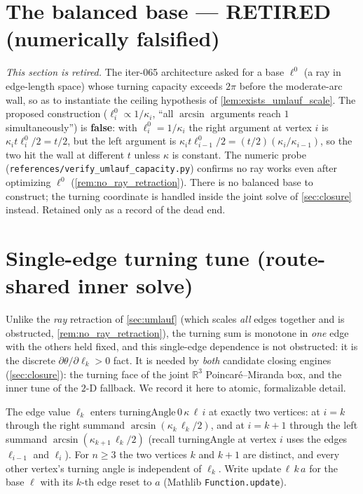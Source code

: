 \section{The balanced base --- RETIRED (numerically falsified)}
\label{sec:balanced}

\emph{This section is retired.} The iter-065 architecture asked for a base
$\ell^0$ (a ray in edge-length space) whose turning capacity exceeds $2\pi$
before the moderate-arc wall, so as to instantiate the ceiling hypothesis of
\cref{lem:exists_umlauf_scale}. The proposed construction ($\ell^0_i \propto
1/\kappa_i$, ``all $\arcsin$ arguments reach $1$ simultaneously'') is
\textbf{false}: with $\ell^0_i = 1/\kappa_i$ the right argument at vertex $i$ is
$\kappa_i t \ell^0_i/2 = t/2$, but the left argument is $\kappa_i t \ell^0_{i-1}/2
= (t/2)(\kappa_i/\kappa_{i-1})$, so the two hit the wall at different $t$ unless
$\kappa$ is constant. The numeric probe
(\texttt{references/verify\_umlauf\_capacity.py}) confirms no ray works even after
optimizing $\ell^0$ (\cref{rem:no_ray_retraction}). There is no balanced base to
construct; the turning coordinate is handled inside the joint solve of
\cref{sec:closure} instead. Retained only as a record of the dead end.

\section{Single-edge turning tune (route-shared inner solve)}
\label{sec:edge_tune}

Unlike the \emph{ray} retraction of \cref{sec:umlauf} (which scales \emph{all}
edges together and is obstructed, \cref{rem:no_ray_retraction}), the turning sum
is monotone in \emph{one} edge with the others held fixed, and this single-edge
dependence is not obstructed: it is the discrete
$\partial\theta/\partial\ell_k > 0$ fact. It is needed by \emph{both} candidate
closing engines (\cref{sec:closure}): the turning face of the joint
$\mathbb{R}^3$ Poincar\'e--Miranda box, and the inner tune of the $2$-D fallback.
We record it here to atomic, formalizable detail.

The edge value $\ell_k$ enters $\mathrm{turningAngle}\,0\,\kappa\,\ell\,i$ at
exactly two vertices: at $i = k$ through the right summand
$\arcsin(\kappa_k\,\ell_k/2)$, and at $i = k+1$ through the left summand
$\arcsin(\kappa_{k+1}\,\ell_k/2)$ (recall $\mathrm{turningAngle}$ at vertex $i$
uses the edges $\ell_{i-1}$ and $\ell_i$). For $n \ge 3$ the two vertices $k$ and
$k+1$ are distinct, and every other vertex's turning angle is independent of
$\ell_k$. Write $\mathrm{update}\,\ell\,k\,a$ for the base $\ell$ with its
$k$-th edge reset to $a$ (Mathlib \texttt{Function.update}).

